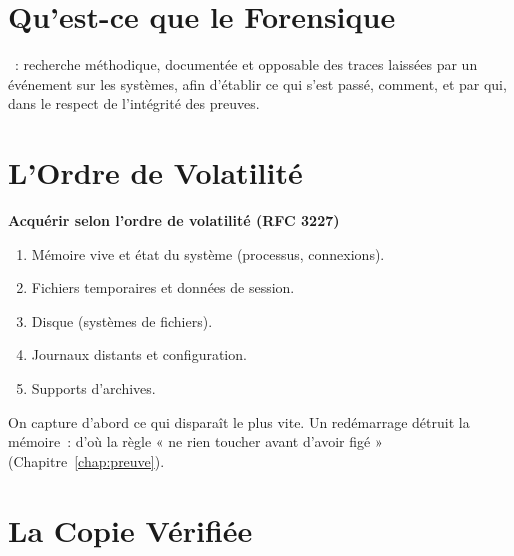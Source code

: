 \separateur

\section{Qu'est-ce que le Forensique}
\label{sec:c11-definir}

\begin{boxdef}
~: recherche méthodique, documentée et opposable
des traces laissées par un événement sur les systèmes, afin d'établir ce qui
s'est passé, comment, et par qui, dans le respect de l'intégrité des preuves.
\end{boxdef}

\section{L'Ordre de Volatilité}
\label{sec:c11-volatilite}

\begin{boxprocedure}
\textbf{Acquérir selon l'ordre de volatilité (RFC 3227)}
\begin{enumerate}
    \item Mémoire vive et état du système (processus, connexions).
    \item Fichiers temporaires et données de session.
    \item Disque (systèmes de fichiers).
    \item Journaux distants et configuration.
    \item Supports d'archives.
\end{enumerate}
\end{boxprocedure}

On capture d'abord ce qui disparaît le plus vite. Un redémarrage détruit la
mémoire~: d'où la règle « ne rien toucher avant d'avoir figé »
(Chapitre~\ref{chap:preuve}).

\section{La Copie Vérifiée}
\label{sec:c11-copie}

